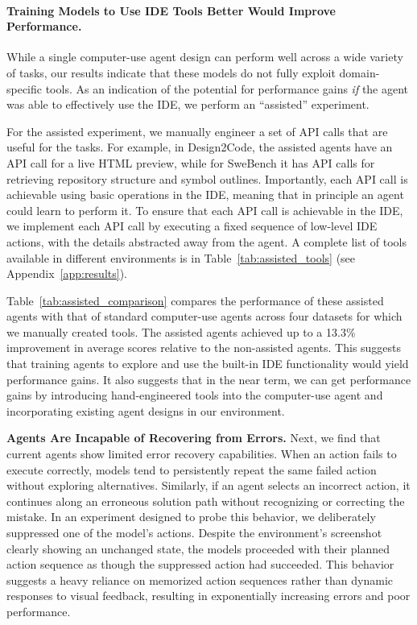 \paragraph{Training Models to Use IDE Tools Better Would Improve Performance.}
\label{sec:assisted_analysis}


While a single computer-use agent design can perform well across a wide variety of tasks, our results indicate that these models do not fully exploit domain-specific tools.
As an indication of the potential for performance gains \textit{if} the agent was able to effectively use the IDE, we perform an ``assisted'' experiment.

For the assisted experiment, we manually engineer a set of API calls that are useful for the tasks.
For example, in Design2Code, the assisted agents have an API call for a live HTML preview, while for SweBench it has API calls for retrieving repository structure and symbol outlines.
Importantly, each API call is achievable using basic operations in the IDE, meaning that in principle an agent could learn to perform it.
To ensure that each API call is achievable in the IDE, we implement each API call by executing a fixed sequence of low-level IDE actions, with the details abstracted away from the agent.
A complete list of tools available in different environments is in Table~\ref{tab:assisted_tools} (see Appendix~\ref{app:results}).

Table~\ref{tab:assisted_comparison} compares the performance of these assisted agents with that of standard computer-use agents across four datasets for which we manually created tools.
The assisted agents achieved up to a 13.3\% improvement in average scores relative to the non-assisted agents.
This suggests that training agents to explore and use the built-in IDE functionality would yield performance gains.
It also suggests that in the near term, we can get performance gains by introducing hand-engineered tools into the computer-use agent and incorporating existing agent designs in our \ours{} environment.














\textbf{Agents Are Incapable of Recovering from Errors.}
Next, we find that current agents
show limited error recovery capabilities.
When an action fails to execute correctly, models tend to persistently repeat the same failed action without exploring alternatives.
Similarly, if an agent selects an incorrect action, it continues along an erroneous solution path without recognizing or correcting the mistake.
In an experiment designed to probe this behavior, we deliberately suppressed one of the model's actions.
Despite the environment's screenshot clearly showing an unchanged state, the models proceeded with their planned action sequence as though the suppressed action had succeeded.
This behavior suggests a heavy reliance on memorized action sequences rather than dynamic responses to visual feedback, resulting in exponentially increasing errors and poor performance.


